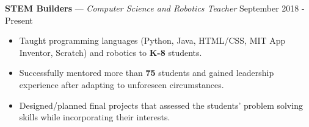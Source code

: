 \documentclass[11pt]{res}
\begin{document}
\begin{footnotesize}
\begin{resume}
\begin{itemize}
\end{itemize}
\vspace{-2.5mm}
\textbf{STEM Builders} — {\sl Computer Science and Robotics Teacher} \hfill September 2018 - Present\vspace{-5mm}
\begin{itemize}[leftmargin=6.25mm] \itemsep -2pt 
\item Taught programming languages (Python, Java, HTML/CSS, MIT App Inventor, Scratch) and robotics to \textbf{K-8} students. 
\vspace{1mm}
\item Successfully mentored more than \textbf{75} students and gained leadership experience after adapting to unforeseen circumstances. 
\vspace{1mm}
\item Designed/planned final projects that assessed the students' problem solving skills while incorporating their interests.
\end{itemize}
\begin{small}

\end{small}
\end{resume}
\end{footnotesize}
\end{document}
